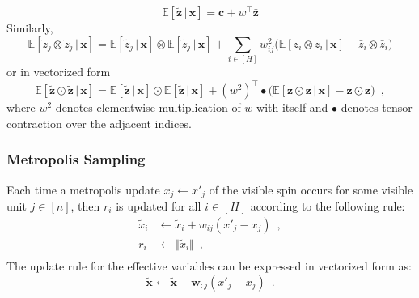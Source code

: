 \documentclass[12pt]{article}
\theoremstyle{definition}%
\theoremstyle{definition}
\theoremstyle{remark}
\begin{document}
\begin{equation}
	\mathbb{E}[\tilde{\bm{z}} \, | \, \bm{x} ] = \bm{c} + w^\top \bar{\bm{z}}
\end{equation}
Similarly,
\begin{equation}
	\mathbb{E}[\tilde{z}_j \otimes \tilde{z}_j \, | \, \bm{x}] 
		= \mathbb{E}[\tilde{z}_j \, | \, \bm{x}] \otimes \mathbb{E}[\tilde{z}_j \, | \, \bm{x}] + \sum_{i \in [H]} w_{ij}^2 \big( \mathbb{E} [z_i \otimes z_i \, | \, \bm{x} ] - \bar{z}_i \otimes \bar{z}_i \big)
\end{equation}
or in vectorized form
\begin{equation}
	\mathbb{E}[\tilde{\bm{z}} \odot \tilde{\bm{z}} \, | \, \bm{x}] 
		= \mathbb{E}[\tilde{\bm{z}} \, | \, \bm{x}] \odot \mathbb{E}[\tilde{\bm{z}} \, | \, \bm{x}] + (w^2)^\top \bullet \big( \mathbb{E} [\bm{z} \odot \bm{z} \, | \, \bm{x} ] - \bar{\bm{z}} \odot \bar{\bm{\bm{z}}} \big) \enspace ,
\end{equation}
where $w^2$ denotes elementwise multiplication of $w$ with itself and $\bullet$ denotes tensor contraction over the adjacent indices.
\subsubsection{Metropolis Sampling}
Each time a metropolis update $x_j \gets x'_j$ of the visible spin occurs for some visible unit $j \in [n]$, then $r_i$ is updated for all $i\in[H]$ according to the following rule:
\begin{align}
	\tilde{x}_i
		& \gets \tilde{x}_i + w_{ij}(x'_j-x_j) \enspace , \\
	r_i
		& \gets \Vert \tilde{x}_i \Vert \enspace , \\
\end{align}
The update rule for the effective variables can be expressed in vectorized form as:
\begin{equation}
	\tilde{\bm{x}} \gets \tilde{\bm{x}} + \bm{w}_{\bm{:}j}(x'_j - x_j) \enspace .
\end{equation}
\end{document}
